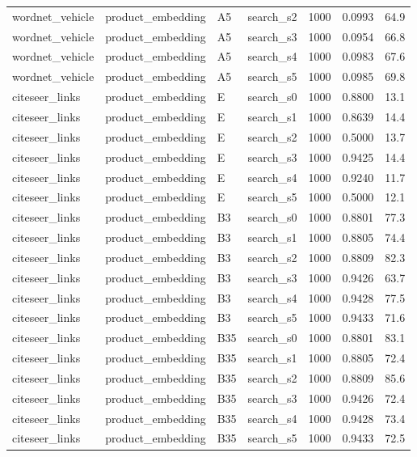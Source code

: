 \begin{longtable}{llllrrr}
wordnet\_vehicle & product\_embedding & A5 & search\_s2 & 1000 & 0.0993 & 64.9 \\
wordnet\_vehicle & product\_embedding & A5 & search\_s3 & 1000 & 0.0954 & 66.8 \\
wordnet\_vehicle & product\_embedding & A5 & search\_s4 & 1000 & 0.0983 & 67.6 \\
wordnet\_vehicle & product\_embedding & A5 & search\_s5 & 1000 & 0.0985 & 69.8 \\
citeseer\_links & product\_embedding & E & search\_s0 & 1000 & 0.8800 & 13.1 \\
citeseer\_links & product\_embedding & E & search\_s1 & 1000 & 0.8639 & 14.4 \\
citeseer\_links & product\_embedding & E & search\_s2 & 1000 & 0.5000 & 13.7 \\
citeseer\_links & product\_embedding & E & search\_s3 & 1000 & 0.9425 & 14.4 \\
citeseer\_links & product\_embedding & E & search\_s4 & 1000 & 0.9240 & 11.7 \\
citeseer\_links & product\_embedding & E & search\_s5 & 1000 & 0.5000 & 12.1 \\
citeseer\_links & product\_embedding & B3 & search\_s0 & 1000 & 0.8801 & 77.3 \\
citeseer\_links & product\_embedding & B3 & search\_s1 & 1000 & 0.8805 & 74.4 \\
citeseer\_links & product\_embedding & B3 & search\_s2 & 1000 & 0.8809 & 82.3 \\
citeseer\_links & product\_embedding & B3 & search\_s3 & 1000 & 0.9426 & 63.7 \\
citeseer\_links & product\_embedding & B3 & search\_s4 & 1000 & 0.9428 & 77.5 \\
citeseer\_links & product\_embedding & B3 & search\_s5 & 1000 & 0.9433 & 71.6 \\
citeseer\_links & product\_embedding & B35 & search\_s0 & 1000 & 0.8801 & 83.1 \\
citeseer\_links & product\_embedding & B35 & search\_s1 & 1000 & 0.8805 & 72.4 \\
citeseer\_links & product\_embedding & B35 & search\_s2 & 1000 & 0.8809 & 85.6 \\
citeseer\_links & product\_embedding & B35 & search\_s3 & 1000 & 0.9426 & 72.4 \\
citeseer\_links & product\_embedding & B35 & search\_s4 & 1000 & 0.9428 & 73.4 \\
citeseer\_links & product\_embedding & B35 & search\_s5 & 1000 & 0.9433 & 72.5 \\

\end{longtable}
